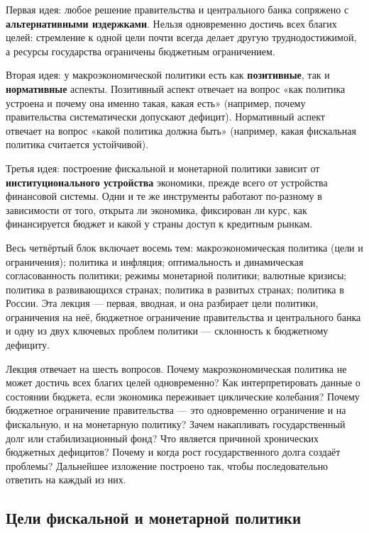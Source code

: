 \documentclass[11pt,a4paper]{article}
\begin{document}
Первая идея: любое решение правительства и центрального банка сопряжено с \textbf{альтернативными издержками}. Нельзя одновременно достичь всех благих целей: стремление к одной цели почти всегда делает другую труднодостижимой, а ресурсы государства ограничены бюджетным ограничением.

Вторая идея: у макроэкономической политики есть как \textbf{позитивные}, так и \textbf{нормативные} аспекты. Позитивный аспект отвечает на вопрос «как политика устроена и почему она именно такая, какая есть» (например, почему правительства систематически допускают дефицит). Нормативный аспект отвечает на вопрос «какой политика должна быть» (например, какая фискальная политика считается устойчивой).

Третья идея: построение фискальной и монетарной политики зависит от \textbf{институционального устройства} экономики, прежде всего от устройства финансовой системы. Одни и те же инструменты работают по-разному в зависимости от того, открыта ли экономика, фиксирован ли курс, как финансируется бюджет и какой у страны доступ к кредитным рынкам.

Весь четвёртый блок включает восемь тем: макроэкономическая политика (цели и ограничения); политика и инфляция; оптимальность и динамическая согласованность политики; режимы монетарной политики; валютные кризисы; политика в развивающихся странах; политика в развитых странах; политика в России. Эта лекция --- первая, вводная, и она разбирает цели политики, ограничения на неё, бюджетное ограничение правительства и центрального банка и одну из двух ключевых проблем политики --- склонность к бюджетному дефициту.

Лекция отвечает на шесть вопросов. Почему макроэкономическая политика не может достичь всех благих целей одновременно? Как интерпретировать данные о состоянии бюджета, если экономика переживает циклические колебания? Почему бюджетное ограничение правительства --- это одновременно ограничение и на фискальную, и на монетарную политику? Зачем накапливать государственный долг или стабилизационный фонд? Что является причиной хронических бюджетных дефицитов? Почему и когда рост государственного долга создаёт проблемы? Дальнейшее изложение построено так, чтобы последовательно ответить на каждый из них.

\subsection{Цели фискальной и монетарной политики}
\end{document}
